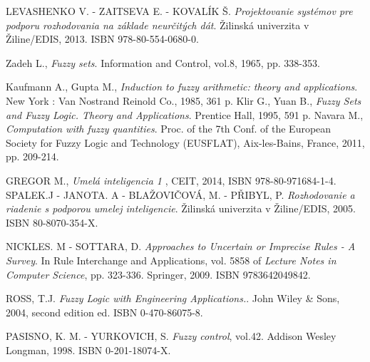 \begin{thebibliography}{}                               
	 \label{literatura}


 LEVASHENKO V. - ZAITSEVA E. - KOVALÍK Š. {\it Projektovanie systémov pre podporu rozhodovania na základe neurčitých dát}. Žilinská univerzita v Žiline/EDIS, 2013. ISBN 978-80-554-0680-0.


 Zadeh L., {\it Fuzzy sets}. Information and Control, vol.8, 1965, pp. 338-353. 

 Kaufmann A., Gupta M., {\it Induction to fuzzy arithmetic: theory and applications}. New York : Van Nostrand Reinold Co., 1985, 361 p. 
Klir G., Yuan B., {\it Fuzzy Sets and Fuzzy Logic. Theory and Applications}. Prentice Hall, 1995, 591 p. 
Navara M., {\it Computation with fuzzy quantities}. Proc. of the 7th Conf. of the European Society for Fuzzy Logic and Technology (EUSFLAT), Aix-les-Bains, France, 2011, pp. 209-214.






 GREGOR M., {\it Umelá inteligencia 1} , CEIT, 2014, ISBN 978-80-971684-1-4.
 SPALEK.J - JANOTA. A - BLAŽOVIČOVÁ, M. - PŘIBYL, P. {\it Rozhodovanie a riadenie s podporou umelej inteligencie}. Žilinská univerzita v Žiline/EDIS, 2005. ISBN 80-8070-354-X. 

 NICKLES. M - SOTTARA, D. {\it Approaches to Uncertain or Imprecise Rules - A Survey}. In Rule Interchange and Applications, vol. 5858 of {\it Lecture Notes in Computer Science}, pp. 323-336. Springer, 2009. ISBN 9783642049842. 

 ROSS, T.J. {\it  Fuzzy Logic with Engineering Applications.}. John Wiley \& Sons, 2004, second edition ed. ISBN 0-470-86075-8. 



PASISNO, K. M. - YURKOVICH, S. {\it Fuzzy control}, vol.42. Addison Wesley Longman, 1998. ISBN 0-201-18074-X.  

        
\end{thebibliography}


